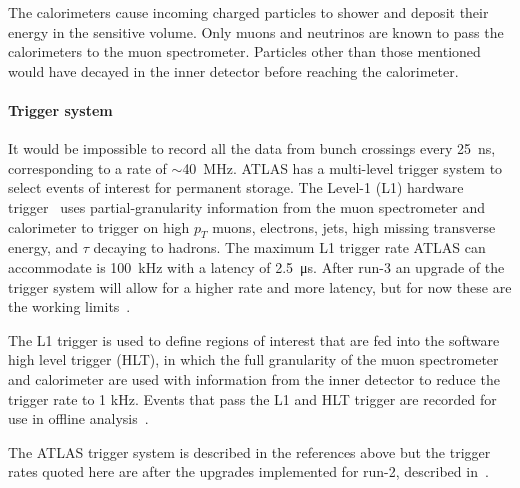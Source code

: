 The calorimeters cause incoming charged particles to shower and deposit their energy in the sensitive volume. Only muons and neutrinos are known to pass the calorimeters to the muon spectrometer.  Particles other than those mentioned would have decayed in the inner detector before reaching the calorimeter. 

\paragraph*{Trigger system} \hfill \break
It would be impossible to record all the data from bunch crossings every \SI{25}{\nano\second}, corresponding to a rate of $\sim$\SI{40}{MHz}. ATLAS has a multi-level trigger system to select events of interest for permanent storage. The Level-1 (L1) hardware trigger~\cite{atlas_l1_trigger_tdr} uses partial-granularity information from the muon spectrometer and calorimeter to trigger on high $p_T$ muons, electrons, jets, high missing transverse energy, and $\tau$ decaying to hadrons. The maximum L1 trigger rate ATLAS can accommodate is \SI{100}{kHz} with a latency of \SI{2.5}{\micro\second}. After run-3 an upgrade of the trigger system will allow for a higher rate and more latency, but for now these are the working limits~\cite{tdaq_phase2_tdr}.


The L1 trigger is used to define regions of interest that are fed into the software high level trigger (HLT), in which the full granularity of the muon spectrometer and calorimeter are used with information from the inner detector to reduce the trigger rate to 1 kHz. Events that pass the L1 and HLT trigger are recorded for use in offline analysis~\cite{atlas_hlt_trigger_tdr}.

The ATLAS trigger system is described in the references above but the trigger rates quoted here are after the upgrades implemented for run-2, described in~\cite{martinez_run-2_2016}.

